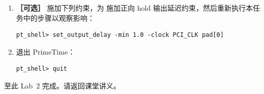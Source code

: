 \begin{enumerate}
\begin{questionBox}
\textbf{问题 21.}\ ``data required time'' 是否符合你的预期？\\[0.35em]
\textbf{答：} 是。捕获时钟边为 0\,ns，这对 hold 是合适的。
hold 要求为正向 \textbf{1\,ns}，propagated 时钟网络延迟为 0\,ns：
\begin{lstlisting}
clock PCI_CLK (rise edge)                0.000     0.000
clock network delay (propagated)         0.000     0.000
output external delay                      1.000     1.000
data required time                                   1.000
\end{lstlisting}

\noindent\textbf{［可选步骤］} 施加  后：

\begin{lstlisting}
pt_shell> report_port -output_delay pad[0]
Output Delay
Min    Max    Related    Related
Output Port  Rise  Fall  Rise  Fall  Clock    Pin
pad[0]       1.00  1.00  4.00  4.00  PCI_CLK  --

pt_shell> report_timing -to pad[0] -delay min -path short
...
clock network delay (propagated)         0.772     0.772
...
data arrival time                                  3.445
clock PCI_CLK (rise edge)                0.000     0.000
clock network delay (propagated)         0.000     0.000
output external delay                     -1.000    -1.000
data required time                                  -1.000
slack (MET)                                          4.445
\end{lstlisting}
由上可见：对 output delay 使用正向 hold 约束会\textbf{增大}正向 slack。
这证实：对 output delay 指定负 hold 约束，实际上是在 output 端口上指定 hold 要求。
\end{questionBox}

  \item \textbf{［可选］} 施加下列约束，为  施加正向 hold 输出延迟约束，然后重新执行本任务中的步骤以观察影响：
\begin{lstlisting}
pt_shell> set_output_delay -min 1.0 -clock PCI_CLK pad[0]
\end{lstlisting}

  \item 退出 PrimeTime：
\begin{lstlisting}
pt_shell> quit
\end{lstlisting}
\end{enumerate}

\noindent 至此 Lab~2 完成。请返回课堂讲义。
